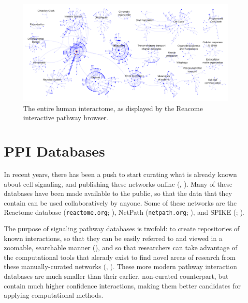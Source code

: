 \documentclass[12pt,twoside]{reedthesis}
\theoremstyle{definition}
\begin{document}
\begin{figure}[h]
  \begin{center}
    \includegraphics[width=\textwidth]{human_interactome}
  \caption[Human interactome]{The entire human interactome, as displayed by the Reacome interactive pathway browser.}
  \label{fig:human_interactome}
  \end{center}
\end{figure}

\section{PPI Databases}

In recent years, there has been a push to start curating what is already known about cell signaling, and publishing these networks online (\cite{Bauer-Mehren2009}, \cite{Cusick2009}). Many of these databases have been made available to the public, so that the data that they contain can be used collaboratively by anyone. Some of these networks are the Reactome database (\texttt{reactome.org}; \cite{Matthews2009}), NetPath (\texttt{netpath.org}; \cite{Kandasamy2010}), and SPIKE (; \cite{Paz2011}).\par
The purpose of signaling pathway databases is twofold: to create repositories of known interactions, so that they can be easily referred to and viewed in a zoomable, searchable manner (\cite{Hu2007}), and so that researchers can take advantage of the computational tools that alerady exist to find novel areas of research from these manually-curated networks (\cite{Karlebach2008}, \cite{Battle2010}). These more modern pathway interaction databases are much smaller than their earlier, non-curated counterpart, but contain much higher confidence interactions, making them better candidates for applying computational methods.\par
\end{document}
